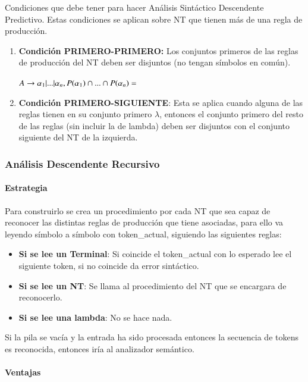 \documentclass[12pt, twoside, openright]{report} %
\begin{document}
Condiciones que debe tener para hacer Análisis Sintáctico Descendente
Predictivo.
Estas condiciones se aplican sobre NT que tienen más de una regla de
producción.

\begin{enumerate}
	\def\labelenumi{\arabic{enumi}.}
	\item \textbf{Condición PRIMERO-PRIMERO:} Los conjuntos primeros de las
	      reglas de producción del NT deben ser disjuntos (no tengan símbolos en
	      común).

	      \(A \rightarrow \alpha_1 |...|\alpha_n, P(\alpha_1) \cap ... \cap P(\alpha_n) = \empty\)
	\item \textbf{Condición PRIMERO-SIGUIENTE}: Esta se aplica cuando alguna de
	      las reglas tienen en su conjunto primero \(\lambda\), entonces el
	      conjunto primero del resto de las reglas (sin incluir la de lambda)
	      deben ser disjuntos con el conjunto siguiente del NT de la izquierda.
\end{enumerate}


\subsubsection{Análisis Descendente Recursivo}


\paragraph{Estrategia}

Para construirlo se crea un procedimiento por cada NT que sea capaz de
reconocer las distintas reglas de producción que tiene asociadas, para
ello va leyendo símbolo a símbolo con token\_actual, siguiendo las
siguientes reglas:

\begin{itemize}
	\item \textbf{Si se lee un Terminal}: Si coincide el token\_actual con lo esperado
	      lee el siguiente token, si no coincide da error sintáctico.
	\item \textbf{Si se lee un NT}: Se llama al procedimiento del NT que se encargara de
	      reconocerlo.
	\item \textbf{Si se lee una lambda}: No se hace nada.
\end{itemize}

Si la pila se vacía y la entrada ha sido procesada entonces la secuencia
de tokens es reconocida, entonces iría al analizador semántico.


\paragraph{Ventajas}
\end{document}

